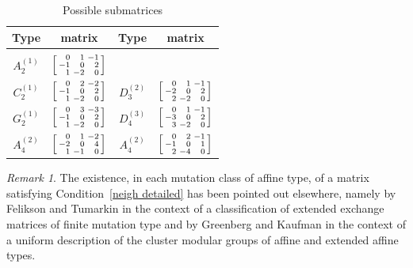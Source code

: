 \documentclass[10pt]{article}
\theoremstyle{definition}
\theoremstyle{remark}
\newtheorem{remark}[proposition]{Remark}
\numberwithin{equation}{section}
\newcommand{\0}{{\mathbf{0}}}
\begin{document}
	\begin{table}
	\caption{Possible submatrices}
	\label{submat tab}	
\begin{center}
	\begin{tabular}{|cc|cc|}
	Type & matrix & Type & matrix \\
	\hline & & & \\[-1ex]
	$A_{2}^{(1)}$ & $\begin{bsmallmatrix*}[r]
	0 & 1 & -1 \\
	-1 & 0 & 2 \\
	1 & -2 & 0
	\end{bsmallmatrix*}$ & & \\[4ex]
	$C_{2}^{(1)}$ & $\begin{bsmallmatrix*}[r]
	0 & 2 & -2 \\
	-1 & 0 & 2 \\
	1 & -2 & 0
	\end{bsmallmatrix*}$ &
	$D_{3}^{(2)}$ & $\begin{bsmallmatrix*}[r]
	0 & 1 & -1 \\
	-2 & 0 & 2 \\
	2 & -2 & 0
	\end{bsmallmatrix*}$ \\[4ex]
	$G_2^{(1)}$ & $\begin{bsmallmatrix*}[r]
	0 & 3 & -3 \\
	-1 & 0 & 2 \\
	1 & -2 & 0
	\end{bsmallmatrix*}$ &
	$D_4^{(3)}$ & $\begin{bsmallmatrix*}[r]
	0 & 1 & -1 \\
	-3 & 0 & 2 \\
	3 & -2 & 0
	\end{bsmallmatrix*}$ \\[4ex]
	$A_{4}^{(2)}$ & $\begin{bsmallmatrix*}[r]
	0 & 1 & -2 \\
	-2 & 0 & 4 \\
	1 & -1 & 0
	\end{bsmallmatrix*}$ &
	$A_{4}^{(2)}$ & $\begin{bsmallmatrix*}[r]
	0 & 2 & -1 \\
	-1 & 0 & 1 \\
	2 & -4 & 0
	\end{bsmallmatrix*}$ 
	\end{tabular}
\end{center}	
	\end{table}

\begin{remark}\label{related remark}
The existence, in each mutation class of affine type, of a matrix satisfying Condition~\ref{neigh detailed} 
has been pointed out elsewhere, namely by Felikson and Tumarkin \cite{FeTuCoeff} in the context of a classification of extended exchange matrices of finite mutation type and by Greenberg and Kaufman \cite{GreenbergKaufman} in the context of a uniform description of the cluster modular groups of affine and extended affine types.  
\end{remark}
\end{document}
